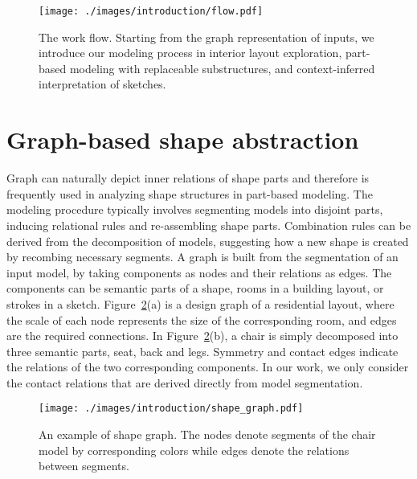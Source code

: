 \begin{figure}[t!]
  \texttt{[image: ./images/introduction/flow.pdf]}
  \caption[Work flow.]{The work flow. Starting from the graph representation of inputs, we introduce our modeling process in interior layout exploration, part-based modeling with replaceable substructures, and context-inferred interpretation of sketches.}
  \label{fig:work_flow}
\end{figure}


\section{Graph-based shape abstraction}

Graph can naturally depict inner relations of shape parts and therefore is frequently used in analyzing shape structures in part-based modeling. The modeling procedure typically involves segmenting models into disjoint parts, inducing relational rules and re-assembling shape parts. Combination rules can be derived from the decomposition of models, suggesting how a new shape is created by recombing necessary segments. A graph is built from the segmentation of an input model, by taking components as nodes and their relations as edges. The components can be semantic parts of a shape, rooms in a building layout, or strokes in a sketch. Figure~\ref{fig:intro_shape_graph}(a) is a design graph of a residential layout, where the scale of each node represents the size of the corresponding room, and edges are the required connections. In Figure~\ref{fig:intro_shape_graph}(b), a chair is simply decomposed into three semantic parts, seat, back and legs. Symmetry and contact edges indicate the relations of the two corresponding components. In our work, we only consider the contact relations that are derived directly from model segmentation.

\begin{figure}\centering
  \texttt{[image: ./images/introduction/shape\_graph.pdf]}
  \caption[An example of shape graph.]{An example of shape graph. The nodes denote segments of the chair model by corresponding colors while edges denote the relations between segments.}
  \label{fig:intro_shape_graph}
\end{figure}

